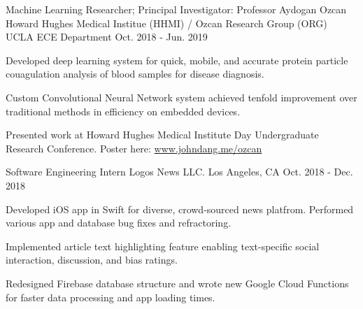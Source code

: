 \begin{cventries}
  \cventry
    {Machine Learning Researcher; Principal Investigator: Professor Aydogan Ozcan} %
    {Howard Hughes Medical Institue (HHMI) / Ozcan Research Group (ORG)} %
    {UCLA ECE Department} %
    {Oct. 2018 - Jun. 2019} %
    {
      \begin{cvitems} %
        \item {Developed deep learning system for quick, mobile, and accurate protein particle couagulation analysis of blood samples for disease diagnosis.}
        \item {Custom Convolutional Neural Network system achieved tenfold improvement over traditional methods in efficiency on embedded devices.}
        \item Presented work at Howard Hughes Medical Institute Day Undergraduate Research Conference. Poster here: \href{https://www.johndang.me/ozcan}{www.johndang.me/ozcan}
      \end{cvitems}
    }

  \cventry
    {Software Engineering Intern} %
    {Logos News LLC.} %
    {Los Angeles, CA} %
    {Oct. 2018 - Dec. 2018} %
    {
      \begin{cvitems} %
        \item {Developed iOS app in Swift for diverse, crowd-sourced news platfrom. Performed various app and database bug fixes and refractoring.
        \item Implemented article text highlighting feature enabling text-specific social interaction, discussion, and bias ratings.}
        \item Redesigned Firebase database structure and wrote new Google Cloud Functions for faster data processing and app loading times.
      \end{cvitems}
    }

\end{cventries}
